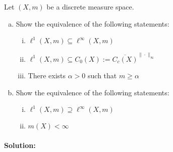 Let $(X,m)$ be a discrete measure space.
\begin{enumerate}[(a)]
	\item 
		Show the equivalence of the following statements:
		\begin{enumerate}[(i)]
			\item 
				$\ell^{1}(X,m)\subseteq\ell^{\infty}(X,m)$
			\item 
				$\ell^{1}(X,m)\subseteq C_{0}(X):=\overline{C_{c}(X)}^{\|\cdot\|_{\infty}}$
			\item 
				There exists $\alpha>0$ such that $m\geq\alpha$
		\end{enumerate}
	\item 
		Show the equivalence of the following statements:
		\begin{enumerate}[(i)]
			\item 
				$\ell^{1}(X,m)\supseteq\ell^{\infty}(X,m)$
			\item 
				$m(X)<\infty$
		\end{enumerate}
\end{enumerate}

\paragraph{Solution:}

